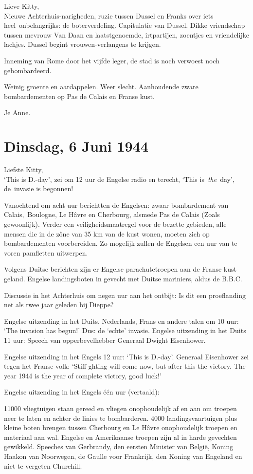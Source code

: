 \documentclass{book}
\begin{document}
Lieve Kitty,\\
Nieuwe Achterhuis-narigheden, ruzie tussen Dussel en Franks over
iets heel~onbelangrijks: de boterverdeling. Capitulatie van Dussel. Dikke
vriendschap tussen mevrouw Van Daan en laatstgenoemde, irtpartijen, zoentjes en
vriendelijke lachjes. Dussel begint vrouwen-verlangens te krijgen.

Inneming van Rome door het vijfde leger, de stad is noch verwoest noch
gebombardeerd.

Weinig groente en aardappelen. Weer slecht. Aanhoudende zware bombardementen op
Pas de Calais en Franse kust.

Je Anne.

\section*{Dinsdag, 6 Juni 1944}

Liefste Kitty,\\
`This is D.-day', zei om 12 uur de Engelse radio en terecht,
`This is~\emph{the}~day', de~invasie is begonnen!

Vanochtend om acht uur berichtten de Engelsen: zwaar bombardement van
Calais,~Boulogne, Le Hâvre en Cherbourg, alsmede Pas de Calais (Zoals
gewoonlijk). Verder een veiligheidsmaatregel voor de bezette gebieden, alle
mensen die in de zône van 35 km van de kust wonen, moeten zich op bombardementen
voorbereiden. Zo mogelijk zullen de Engelsen een uur van te voren pamfletten
uitwerpen.

Volgens Duitse berichten zijn er Engelse parachutetroepen aan de Franse kust
geland. Engelse landingsboten in gevecht met Duitse mariniers, aldus de B.B.C.

Discussie in het Achterhuis om negen uur aan het ontbijt: Is dit een
proeflanding net als twee jaar geleden bij Dieppe?

Engelse uitzending in het Duits, Nederlands, Frans en andere talen om 10 uur:
`The invasion has begun!' Dus: de `echte' invasie. Engelse uitzending in het
Duits 11 uur: Speech van opperbevelhebber Generaal Dwight Eisenhower.

Engelse uitzending in het Engels 12 uur: `This is D.-day'. Generaal Eisenhower
zei tegen het Franse volk: `Stiff ghting will come now, but after this the
victory. The year 1944 is the year of complete victory, good luck!'

Engelse uitzending in het Engels één uur (vertaald):

11000 vliegtuigen staan gereed en vliegen onophoudelijk af en aan om troepen
neer te laten en achter de linies te bombarderen. 4000 landingsvaartuigen plus
kleine boten brengen tussen Cherbourg en Le Hâvre onophoudelijk troepen en
materiaal aan wal. Engelse en Amerikaanse troepen zijn al in harde gevechten
gewikkeld. Speeches van Gerbrandy, den eersten Minister van België, Koning
Haakon van Noorwegen, de Gaulle voor Frankrijk, den Koning van Engeland en niet
te vergeten Churchill.
\end{document}
